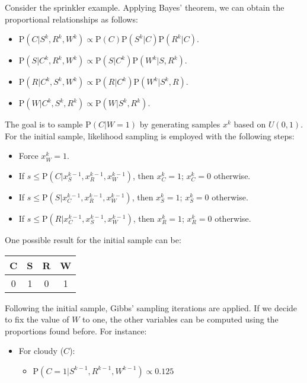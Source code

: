 \begin{example}
    Consider the sprinkler example. 
    Applying Bayes' theorem, we can obtain the proportional relationships as follows:
    \begin{itemize}
        \item $\text{P}(C|S^k,R^k,W^k) \propto \text{P}(C)\text{P}(S^k|C)\text{P}(R^k|C)$.
        \item $\text{P}(S|C^k,R^k,W^k) \propto \text{P}(S|C^k)\text{P}(W^k|S,R^k)$.
        \item $\text{P}(R|C^k,S^k,W^k) \propto \text{P}(R|C^k)\text{P}(W^k|S^k,R)$.
        \item $\text{P}(W|C^k,S^k,R^k) \propto \text{P}(W|S^k,R^k)$.
    \end{itemize}
    The goal is to sample $\text{P}(C|W=1)$  by generating samples $x^k$ based on $U(0,1)$. 
    For the initial sample, likelihood sampling is employed with the following steps:
    \begin{itemize}
        \item Force $x_W^k=1$. 
        \item If $ s \leq \text{P}(C|x_S^{k-1},x_R^{k-1},x_W^{k-1})$, then $x_C^k=1$; $x_C^k=0$ otherwise. 
        \item If $ s \leq \text{P}(S|x_C^{k-1},x_R^{k-1},x_W^{k-1})$, then $x_S^k=1$; $x_S^k=0$ otherwise. 
        \item If $ s \leq \text{P}(R|x_C^{k-1},x_S^{k-1},x_W^{k-1})$, then $x_R^k=1$; $x_R^k=0$ otherwise. 
    \end{itemize}
    One possible result for the initial sample can be:
    \begin{table}[H]
        \centering
        \begin{tabular}{cccc}
        \hline
        \textbf{C} & \textbf{S} & \textbf{R} & \textbf{W} \\ \hline
        0          & 1          & 0          & 1          \\ \hline
        \end{tabular}
    \end{table}
    Following the initial sample, Gibbs' sampling iterations are applied.
    If we decide to fix the value of $W$ to one, the other variables can be computed using the proportions found before. 
    For instance:    
    \begin{itemize}
        \item For cloudy ($C$):
            \begin{itemize}
                \item $\text{P}(C=1|S^{k-1},R^{k-1},W^{k-1}) \propto 0.125$

\end{itemize}
\end{itemize}
\end{example}
